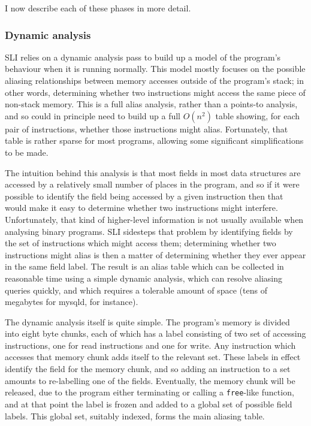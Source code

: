 I now describe each of these phases in more detail.

\subsubsection{Dynamic analysis}

SLI relies on a dynamic analysis pass to build up a model of the
program's behaviour when it is running normally.  This model mostly
focuses on the possible aliasing relationships between memory accesses
outside of the program's stack; in other words, determining whether
two instructions might access the same piece of non-stack memory.
This is a full alias analysis, rather than a points-to analysis, and
so could in principle need to build up a full $O(n^2)$ table showing,
for each pair of instructions, whether those instructions might alias.
Fortunately, that table is rather sparse for most programs, allowing
some significant simplifications to be made.

The intuition behind this analysis is that most fields in most data
structures are accessed by a relatively small number of places in the
program, and so if it were possible to identify the field being
accessed by a given instruction then that would make it easy to
determine whether two instructions might interfere.
Unfortunately, that kind of higher-level information is not usually
available when analysing binary programs.  SLI sidesteps that problem
by identifying fields by the set of instructions which might access
them; determining whether two instructions might alias is then a
matter of determining whether they ever appear in the same field
label.  The result is an alias table which can be collected in
reasonable time using a simple dynamic analysis, which can resolve
aliasing queries quickly, and which requires a tolerable amount of
space (tens of megabytes for mysqld, for instance).

The dynamic analysis itself is quite simple.  The program's memory is
divided into eight byte chunks, each of which has a label consisting
of two set of accessing instructions, one for read instructions and
one for write.  Any instruction which accesses that memory chunk adds
itself to the relevant set.  These labels in effect identify the field
for the memory chunk, and so adding an instruction to a set amounts to
re-labelling one of the fields.  Eventually, the memory chunk will be
released, due to the program either terminating or calling a
\verb|free|-like function, and at that point the label is frozen and
added to a global set of possible field labels.  This global set,
suitably indexed, forms the main aliasing table.

